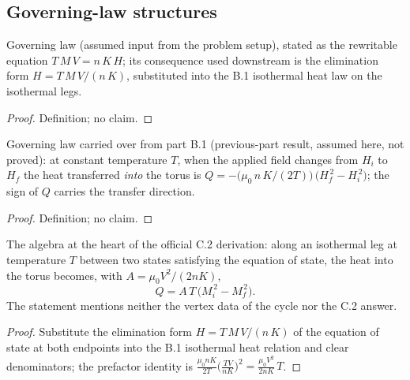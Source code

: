 \subsection*{Governing-law structures}

\begin{definition}
\label{def:IPhO2026Problems_problem_IPhO_2026_3_C_2:EquationOfStateParamagnet}
Governing law (assumed input from the problem setup), stated as the
rewritable equation $T\,M\,V = n\,K\,H$; its consequence used
downstream is the elimination form $H = T\,M\,V/(n\,K)$, substituted
into the B.1 isothermal heat law on the isothermal legs.
\end{definition}
\begin{proof}
Definition; no claim.
\end{proof}

\begin{definition}
\label{def:IPhO2026Problems_problem_IPhO_2026_3_C_2:IsothermalHeatIntoTorus}
Governing law carried over from part B.1 (previous-part result,
assumed here, not proved): at constant temperature $T$, when the
applied field changes from $H_i$ to $H_f$ the heat transferred
\emph{into} the torus is
$Q = -\bigl(\mu_0\,n\,K/(2T)\bigr)\,\bigl(H_f^{\,2} - H_i^{\,2}\bigr)$;
the sign of $Q$ carries the transfer direction.
\end{definition}
\begin{proof}
Definition; no claim.
\end{proof}

\begin{lemma}
\label{lem:IPhO2026Problems_problem_IPhO_2026_3_C_2:magnetization_form}
The algebra at the heart of the official C.2 derivation: along an
isothermal leg at temperature $T$ between two states satisfying the
equation of state, the heat into the torus becomes, with
$A = \mu_0 V^2/(2nK)$,
\[
Q = A\,T\,\bigl(M_i^{\,2} - M_f^{\,2}\bigr).
\]
The statement mentions neither the vertex data of the cycle nor the
C.2 answer.
\end{lemma}
\begin{proof}
Substitute the elimination form $H = T\,M\,V/(n\,K)$ of the equation
of state at both endpoints into the B.1 isothermal heat relation and
clear denominators; the prefactor identity is
$\frac{\mu_0 n K}{2T}\bigl(\frac{TV}{nK}\bigr)^2
 = \frac{\mu_0 V^2}{2nK}\,T$.
\end{proof}

